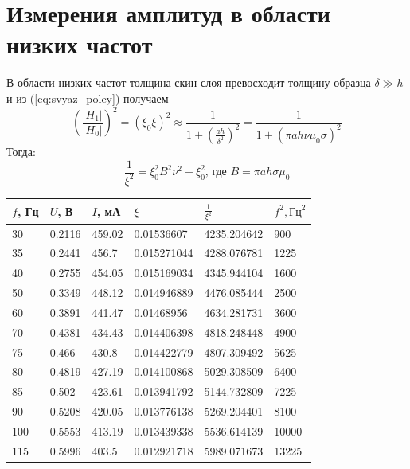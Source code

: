 \documentclass[a4paper, 12pt]{article}
\begin{document}
\section{Измерения амплитуд в области низких частот}
В области низких частот толщина скин-слоя превосходит толщину образца $ \delta \gg h$  и из (\ref{eq:svyaz_poley}) получаем
\begin{equation*}
	\left(\frac{|H_1|}{|H_0|}\right)^2 = (\xi_0\xi)^2 \approx \frac{1}{1+\left(\frac{ah}{\delta^2}\right)^2} = \frac{1}{1 + \left(\pi ah\nu\mu_0\sigma\right)^2}
\end{equation*}
Тогда: 
\begin{equation*}
	\frac{1}{\xi^2}=\xi_0^2B^2\nu^2 + \xi_0^2 \text{, где } B=\pi a h \sigma \mu_0
	\label{eq:liniya_dlya_c}
\end{equation*}
\begin{table}[!ht]
    \centering
    \begin{tabular}{|l|l|l|l|l|l|}
    \hline
        $f$, Гц  & $U$, В & $I$, мА & $\xi$  & $\frac{1}{\xi^2}$ & $f^2, \text{Гц}^2$  \\ \hline
        30 & 0.2116 & 459.02 & 0.01536607 & 4235.204642 & 900 \\ \hline
        35 & 0.2441 & 456.7 & 0.015271044 & 4288.076781 & 1225 \\ \hline
        40 & 0.2755 & 454.05 & 0.015169034 & 4345.944104 & 1600 \\ \hline
        50 & 0.3349 & 448.12 & 0.014946889 & 4476.085444 & 2500 \\ \hline
        60 & 0.3891 & 441.47 & 0.01468956 & 4634.281731 & 3600 \\ \hline
        70 & 0.4381 & 434.43 & 0.014406398 & 4818.248448 & 4900 \\ \hline
        75 & 0.466 & 430.8 & 0.014422779 & 4807.309492 & 5625 \\ \hline
        80 & 0.4819 & 427.19 & 0.014100868 & 5029.308509 & 6400 \\ \hline
        85 & 0.502 & 423.61 & 0.013941792 & 5144.732809 & 7225 \\ \hline
        90 & 0.5208 & 420.05 & 0.013776138 & 5269.204401 & 8100 \\ \hline
        100 & 0.5553 & 413.19 & 0.013439338 & 5536.614139 & 10000 \\ \hline
        115 & 0.5996 & 403.5 & 0.012921718 & 5989.071673 & 13225 \\ \hline
    \end{tabular}
\end{table}
\end{document}
